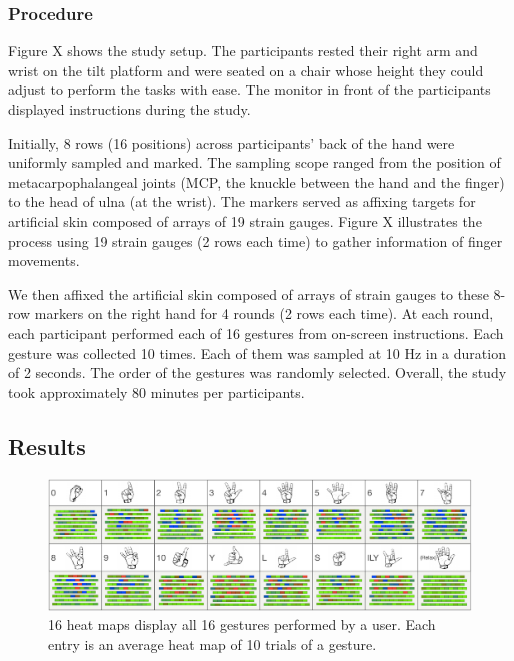 \documentclass{sigchi}
\begin{document}
\subsubsection{Procedure}
Figure X shows the study setup. The participants rested their right arm and wrist on the tilt platform and were seated on a chair whose height they could adjust to perform the tasks with ease. The monitor in front of the participants displayed instructions during the study.

Initially, 8 rows (16 positions) across participants’ back of the hand were uniformly sampled and marked. The sampling scope ranged from the position of metacarpophalangeal joints (MCP, the knuckle between the hand and the finger) to the head of ulna (at the wrist).%
 The markers served as affixing targets for artificial skin composed of arrays of 19 strain gauges. 
Figure X illustrates the process using 19 strain gauges (2 rows each time) to gather information of finger movements.

We then affixed the artificial skin composed of arrays of strain gauges to these 8-row markers on the right hand for 4 rounds (2 rows each time). 
At each round, each participant performed each of 16 gestures from on-screen instructions. Each gesture was collected 10 times. Each of them was sampled at 10 Hz in a duration of 2 seconds.
The order of the gestures was randomly selected. 
Overall, the study took approximately 80 minutes per participants.

\subsection{Results}

\begin{figure}
 \begin{center}
  \includegraphics[width=2\columnwidth]{figures/user16GesturesSV.pdf}
  \caption{ 16 heat maps display all 16 gestures performed by a user. Each entry is an average heat map of 10 trials of a gesture.
  }
  \label{fig:user16GesturesSV}
  \end{center}
\end{figure}
\end{document}
